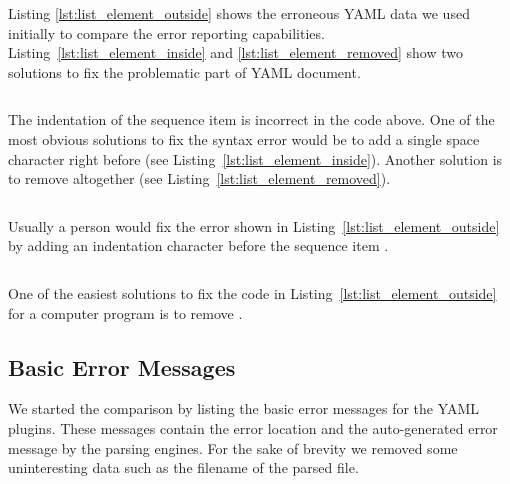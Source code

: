 Listing \ref{lst:list_element_outside} shows the erroneous YAML data we used initially to compare the error reporting capabilities. Listing~\ref{lst:list_element_inside} and \ref{lst:list_element_removed} show two solutions to fix the problematic part of YAML document.

\begin{listing}
  \begin{code-boxed}
    \inputminted{yaml}{Data/Errors/list_element_outside.yaml}
  \end{code-boxed}
  \caption{The indentation of the sequence item  is incorrect in the code above. One of the most obvious solutions to fix the syntax error would be to add a single space character right before  (see Listing~\ref{lst:list_element_inside}). Another solution is to remove  altogether (see Listing~\ref{lst:list_element_removed}).}
  \label{lst:list_element_outside}
\end{listing}

\begin{listing}
  \begin{code-boxed}
    \inputminted{yaml}{Data/Correct/list_element_inside.yaml}
  \end{code-boxed}
  \caption{Usually a person would fix the error shown in Listing~\ref{lst:list_element_outside} by adding an indentation character before the sequence item .}
  \label{lst:list_element_inside}
\end{listing}

\begin{listing}
  \begin{code-boxed}
    \inputminted{yaml}{Data/Correct/list_element_removed.yaml}
  \end{code-boxed}
  \caption{One of the easiest solutions to fix the code in Listing~\ref{lst:list_element_outside} for a computer program is to remove .}
  \label{lst:list_element_removed}
\end{listing}

\subsection{Basic Error Messages}

We started the comparison by listing the basic error messages for the YAML plugins. These messages contain the error location and the auto-generated error message by the parsing engines. For the sake of brevity we removed some uninteresting data such as the filename of the parsed file.

